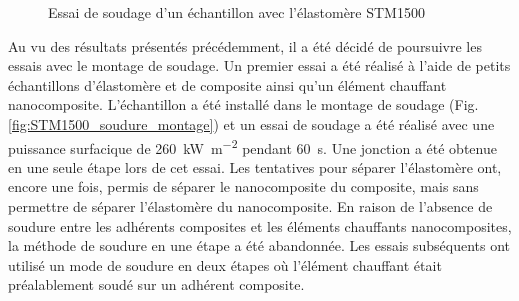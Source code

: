 \begin{figure}[h]
	\centering
	 \qquad
	\caption{Essai de soudage d'un échantillon avec l'élastomère STM1500}
	\label{fig:STM1500_soudure}
\end{figure}

Au vu des résultats présentés précédemment, il a été décidé de poursuivre les essais avec le montage de soudage. 
Un premier essai a été réalisé à l'aide de petits échantillons d'élastomère et de composite ainsi qu'un élément chauffant nanocomposite. 
L'échantillon a été installé dans le montage de soudage (Fig. \ref{fig:STM1500_soudure_montage}) et un essai de soudage a été réalisé avec une puissance surfacique de \SI{260}{\kilo\watt\per\square\metre} pendant \SI{60}{\second}. 
Une jonction a été obtenue en une seule étape lors de cet essai. 
Les tentatives pour séparer l'élastomère ont, encore une fois, permis de séparer le nanocomposite du composite, mais sans permettre de séparer l'élastomère du nanocomposite. 
En raison de l'absence de soudure entre les adhérents composites et les éléments chauffants nanocomposites, la méthode de soudure en une étape a été abandonnée.
Les essais subséquents ont utilisé un mode de soudure en deux étapes où l'élément chauffant était préalablement soudé sur un adhérent composite. 

